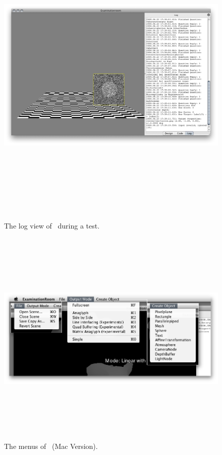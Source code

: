 \begin{figure}
\begin{center}
\includegraphics[height=15cm]{screenshots/er_log_screenshot.png}
\caption{The log view of \ER\ during a test.\label{ssLog}}
\end{center}
\end{figure}

\begin{figure}
\begin{center}
\includegraphics[height=10.5cm]{screenshots/er_menus.png}
\caption{The menus of \ER\ (Mac Version).\label{ssMenu}}
\end{center}
\end{figure}

